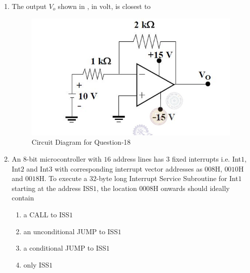 \documentclass[journal,12pt,onecolumn]{IEEEtran}
\theoremstyle{remark}
\begin{document}
\begin{enumerate}
\item The output $V_o$ shown in , in volt, is closest to \par \hfill{}
\begin{figure}[H]
    \centering
    \includegraphics[width=0.5\columnwidth]{Figs/Q-18.png}
    \caption{Circuit Diagram for Question-18}
    \label{fig:placeholder_9}
\end{figure}
\begin{enumerate}
\end{enumerate}

\item An $8$-bit microcontroller with $16$ address lines has $3$ fixed interrupts i.e. Int$1$, Int$2$ and Int$3$ with corresponding interrupt vector addresses as $008$H, $0010$H and $0018$H. To execute a $32$-byte long Interrupt Service Subroutine for Int$1$ starting at the address ISS$1$, the location $0008$H onwards should ideally contain \par \hfill{}
\begin{enumerate}
    \item a CALL to ISS$1$
    \item an unconditional JUMP to ISS$1$
    \item a conditional JUMP to ISS$1$
    \item only ISS$1$
\end{enumerate}


\end{enumerate}
\end{document}
